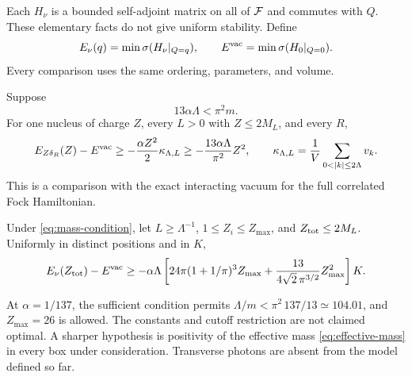 Each $H_\nu$ is a bounded self-adjoint matrix on all of $\mathcal F$ and
commutes with $Q$. These elementary facts do not give uniform stability.
Define
\[
E_\nu(q)=\min\sigma(H_\nu|_{Q=q}),\qquad
E^{\mathrm{vac}}=\min\sigma(H_0|_{Q=0}).
\]
Every comparison uses the same ordering, parameters, and volume.

\begin{theorem}\label{thm:one}
Suppose
\begin{equation}
13\alpha\Lambda<\pi^2m.
\label{eq:mass-condition}
\end{equation}
For one nucleus of charge $Z$, every $L>0$ with $Z\le2M_L$, and every $R$,
\begin{equation}
E_{Z\delta_R}(Z)-E^{\vac}\ge-\frac{\alpha Z^2}{2}\kappa_{\Lambda,L}
\ge-\frac{13\alpha\Lambda}{\pi^2}Z^2,\qquad
\kappa_{\Lambda,L}=\frac1V\sum_{0<|k|\le2\Lambda}v_k.
\label{eq:one-bound}
\end{equation}
This is a comparison with the exact interacting vacuum for the full
correlated Fock Hamiltonian.
\end{theorem}

\begin{theorem}\label{thm:many}
Under \eqref{eq:mass-condition}, let $L\ge\Lambda^{-1}$,
$1\le Z_i\le Z_{\max}$, and $Z_{\rm tot}\le2M_L$.
Uniformly in distinct positions and in $K$,
\begin{equation}
E_\nu(Z_{\rm tot})-E^{\mathrm{vac}}\ge
-\alpha\Lambda\left[
24\pi(1+1/\pi)^3Z_{\max}
+\frac{13}{4\sqrt2\,\pi^{3/2}}Z_{\max}^2
\right]K.
\label{eq:many-bound}
\end{equation}
\end{theorem}

At $\alpha=1/137$, the sufficient condition permits
$\Lambda/m<\pi^2\,137/13\simeq104.01$, and $Z_{\max}=26$ is allowed.
The constants and cutoff restriction are not claimed optimal.
A sharper hypothesis is positivity of the effective mass
\eqref{eq:effective-mass} in every box under consideration.
Transverse photons are absent from the model defined so far.

